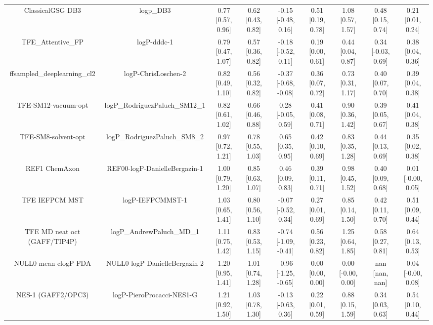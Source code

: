 \documentclass{article}
\begin{document}
\begin{center}
\begin{longtable}{|ccccccccc|}
             ClassicalGSG DB3 &                                      logp\_DB3 &  0.77 [0.57, 0.96] &  0.62 [0.43, 0.82] &   -0.15 [-0.48, 0.16] &  0.51 [0.19, 0.78] &     1.08 [0.57, 1.57] &     0.48 [0.15, 0.74] &     0.21 [0.01, 0.24] \\
             TFE_Attentive_FP &                                    logP-dddc-1 &  0.79 [0.47, 1.07] &  0.57 [0.36, 0.82] &   -0.18 [-0.52, 0.11] &  0.19 [0.00, 0.61] &     0.44 [0.04, 0.87] &    0.34 [-0.03, 0.69] &     0.38 [0.04, 0.36] \\
   ffsampled_deeplearning_cl2 &                            logP-ChrisLoschen-2 &  0.82 [0.49, 1.10] &  0.56 [0.32, 0.82] &  -0.37 [-0.68, -0.08] &  0.36 [0.07, 0.72] &     0.73 [0.31, 1.17] &     0.40 [0.07, 0.70] &     0.39 [0.04, 0.38] \\
          TFE-SM12-vacuum-opt &                 logP\_RodriguezPaluch\_SM12\_1 &  0.82 [0.61, 1.02] &  0.66 [0.46, 0.88] &    0.28 [-0.05, 0.59] &  0.41 [0.08, 0.71] &     0.90 [0.36, 1.42] &     0.39 [0.05, 0.67] &     0.41 [0.04, 0.38] \\
          TFE-SM8-solvent-opt &                  logP\_RodriguezPaluch\_SM8\_2 &  0.97 [0.72, 1.21] &  0.78 [0.55, 1.03] &     0.65 [0.35, 0.95] &  0.42 [0.10, 0.69] &     0.83 [0.35, 1.28] &     0.44 [0.13, 0.69] &     0.35 [0.02, 0.38] \\
                REF1 ChemAxon &                  REF00-logP-DanielleBergazin-1 &  1.00 [0.79, 1.20] &  0.85 [0.63, 1.07] &     0.46 [0.09, 0.83] &  0.39 [0.11, 0.71] &     0.98 [0.45, 1.52] &     0.40 [0.09, 0.68] &    0.01 [-0.00, 0.05] \\
               TFE IEFPCM MST &                               logP-IEFPCMMST-1 &  1.03 [0.65, 1.41] &  0.80 [0.56, 1.10] &   -0.07 [-0.52, 0.34] &  0.27 [0.01, 0.69] &     0.85 [0.14, 1.50] &     0.42 [0.11, 0.70] &     0.51 [0.09, 0.44] \\
 TFE MD neat oct (GAFF/TIP4P) &                      logP\_AndrewPaluch\_MD\_1 &  1.11 [0.75, 1.42] &  0.83 [0.53, 1.15] &  -0.74 [-1.09, -0.41] &  0.56 [0.23, 0.82] &     1.25 [0.64, 1.85] &     0.58 [0.27, 0.81] &     0.64 [0.13, 0.53] \\
         NULL0 mean clogP FDA &                  NULL0-logP-DanielleBergazin-2 &  1.20 [0.95, 1.41] &  1.01 [0.74, 1.28] &  -0.96 [-1.25, -0.65] &  0.00 [0.00, 0.00] &    0.00 [-0.00, 0.00] &        nan [nan, nan] &    0.04 [-0.00, 0.08] \\
           NES-1 (GAFF2/OPC3) &                      logP-PieroProcacci-NES1-G &  1.21 [0.92, 1.50] &  1.03 [0.78, 1.30] &   -0.13 [-0.63, 0.36] &  0.22 [0.01, 0.59] &     0.88 [0.15, 1.59] &     0.34 [0.03, 0.63] &     0.54 [0.10, 0.44] \\

\end{longtable}
\end{center}
\end{document}

